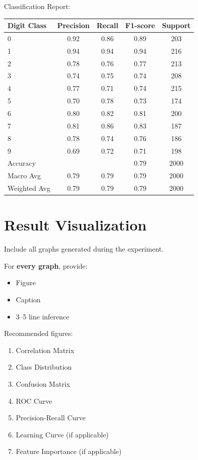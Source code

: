\documentclass[12pt,a4paper]{article}
\begin{document}
Classification Report:
\begin{tabular}{lcccc}
\toprule
Digit Class & Precision & Recall & F1-score & Support \\
\midrule
0 & 0.92 & 0.86 & 0.89 & 203 \\
1 & 0.94 & 0.94 & 0.94 & 216 \\
2 & 0.78 & 0.76 & 0.77 & 213 \\
3 & 0.74 & 0.75 & 0.74 & 208 \\
4 & 0.77 & 0.71 & 0.74 & 215 \\
5 & 0.70 & 0.78 & 0.73 & 174 \\
6 & 0.80 & 0.82 & 0.81 & 200 \\
7 & 0.81 & 0.86 & 0.83 & 187 \\
8 & 0.78 & 0.74 & 0.76 & 186 \\
9 & 0.69 & 0.72 & 0.71 & 198 \\
\midrule
Accuracy & & & 0.79 & 2000 \\
Macro Avg & 0.79 & 0.79 & 0.79 & 2000 \\
Weighted Avg & 0.79 & 0.79 & 0.79 & 2000 \\
\bottomrule
\end{tabular}

\section{Result Visualization}

Include all graphs generated during the experiment.

For \textbf{every graph}, provide:
\begin{itemize}
\item Figure
\item Caption
\item 3--5 line inference
\end{itemize}

Recommended figures:
\begin{enumerate}
\item Correlation Matrix
\item Class Distribution
\item Confusion Matrix
\item ROC Curve
\item Precision-Recall Curve
\item Learning Curve (if applicable)
\item Feature Importance (if applicable)
\end{enumerate}
\end{document}
